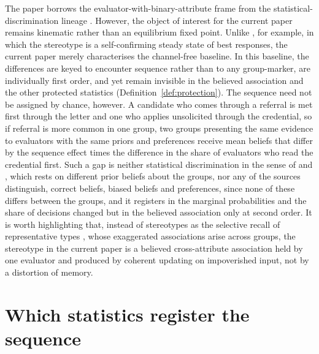 \documentclass[a4paper,fleqn]{cas-sc}
\theoremstyle{remark}
\theoremstyle{definition}
\begin{document}
The paper borrows the evaluator-with-binary-attribute frame from the
statistical-discrimination lineage \citep{Arrow1973,CoateLoury1993}. However, the object of interest for the current paper remains
kinematic rather than an equilibrium fixed point. Unlike \citet{CoateLoury1993}, for example, in which the stereotype is a self-confirming
steady state of best responses, the current paper merely characterises the channel-free baseline. In this baseline, the differences are keyed to encounter sequence rather than to
any group-marker, are individually first order, and yet remain invisible in the believed association and the other protected statistics (Definition~\ref{def:protection}). The sequence need not be assigned by chance, however. A candidate who comes
through a referral is met first through the letter and one who applies unsolicited
through the credential, so if referral is more common in one group, two groups
presenting the same evidence to evaluators with the same priors and preferences
receive mean beliefs that differ by the sequence effect times the difference in the
share of evaluators who read the credential first. Such a gap is neither statistical
discrimination in the sense of \citet{Phelps1972} and \citet{Arrow1973}, which rests
on different prior beliefs about the groups, nor any of the sources
\citet{Bohren2019} distinguish, correct beliefs, biased beliefs and preferences,
since none of these differs between the groups, and it registers in the marginal
probabilities and the share of decisions changed but in the believed association
only at second order. It is worth highlighting that, instead of stereotypes as the selective recall of representative types
\citep{BCGS2016}, whose exaggerated associations arise across groups, the
stereotype in the current paper is a believed cross-attribute association held by
one evaluator and produced by coherent updating on impoverished input, not by a
distortion of memory.


\section{Which statistics register the sequence}
\label{sec:individual}
\end{document}
